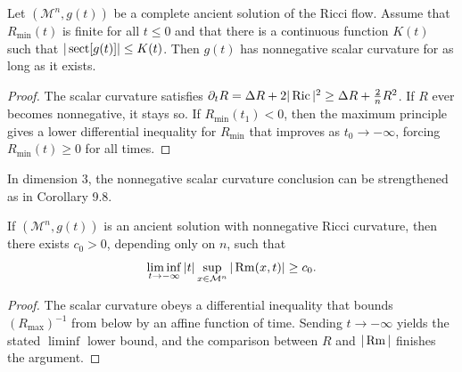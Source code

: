 \begin{lemma}
\label{ch09-lem-ancient-nonnegative-scalar}
Let \((\mathcal M^n,g(t))\) be a complete ancient solution of the Ricci flow. Assume that \(R_{\min}(t)\) is finite for all \(t\le 0\) and that there is a continuous function \(K(t)\) such that \(|\operatorname{sect}[g(t)]|\le K(t)\). Then \(g(t)\) has nonnegative scalar curvature for as long as it exists.
\end{lemma}

\begin{proof}
The scalar curvature satisfies \(\partial_t R=\Delta R+2|\operatorname{Ric}|^2\ge \Delta R+\frac{2}{n}R^2\). If \(R\) ever becomes nonnegative, it stays so. If \(R_{\min}(t_1)<0\), then the maximum principle gives a lower differential inequality for \(R_{\min}\) that improves as \(t_0\to-\infty\), forcing \(R_{\min}(t)\ge 0\) for all times.
\end{proof}

\begin{remark}
\label{ch09-rem-ancient-scalar-three-dimensional}
In dimension \(3\), the nonnegative scalar curvature conclusion can be strengthened as in Corollary 9.8.
\end{remark}

\begin{lemma}
\label{ch09-lem-ancient-lower-blowup-rate}
If \((\mathcal M^n,g(t))\) is an ancient solution with nonnegative Ricci curvature, then there exists \(c_0>0\), depending only on \(n\), such that
\[
\liminf_{t\to -\infty}|t|\sup_{x\in\mathcal M^n}|\operatorname{Rm}(x,t)|\ge c_0.
\]
\end{lemma}

\begin{proof}
The scalar curvature obeys a differential inequality that bounds \((R_{\max})^{-1}\) from below by an affine function of time. Sending \(t\to-\infty\) yields the stated \(\liminf\) lower bound, and the comparison between \(R\) and \(|\operatorname{Rm}|\) finishes the argument.
\end{proof}

